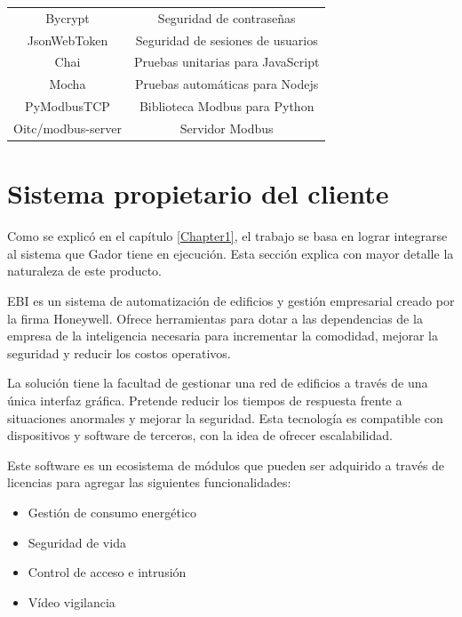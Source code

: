 \begin{table}[h]
\begin{tabular}{c c}
		Bycrypt            & Seguridad de contraseñas                  \\
		JsonWebToken       & Seguridad de sesiones de usuarios         \\
		Chai               & Pruebas unitarias para JavaScript         \\
		Mocha              & Pruebas automáticas para Nodejs           \\
		PyModbusTCP        & Biblioteca Modbus para Python             \\
		Oitc/modbus-server & Servidor Modbus                           \\
		\bottomrule
		\hline
	\end{tabular}
\end{table}

\newpage
\section{Sistema propietario del cliente}

Como se explicó en el capítulo \ref{Chapter1}, el trabajo se basa en lograr integrarse al sistema que Gador tiene en ejecución. Esta sección explica con mayor detalle la naturaleza de este producto.

EBI es un sistema de automatización de edificios y gestión empresarial creado por la firma Honeywell.
Ofrece herramientas para dotar a las dependencias de la empresa de la inteligencia necesaria para incrementar la comodidad, mejorar la seguridad y reducir los costos operativos.

La solución tiene la facultad de gestionar una red de edificios a través de una única interfaz gráfica. Pretende reducir los tiempos de respuesta frente a situaciones anormales y mejorar la seguridad.
Esta tecnología es compatible con dispositivos y software de terceros, con la idea de ofrecer escalabilidad.

Este software es un ecosistema de módulos que pueden ser adquirido a través de licencias para agregar las siguientes funcionalidades:

\begin{itemize}
	\item Gestión de consumo energético
	\item Seguridad de vida
	\item Control de acceso e intrusión
	\item Vídeo vigilancia
\end{itemize}

